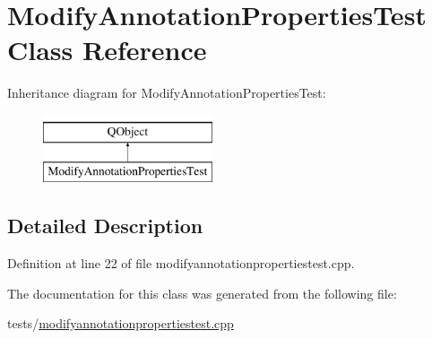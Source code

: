 \hypertarget{classModifyAnnotationPropertiesTest}{\section{Modify\+Annotation\+Properties\+Test Class Reference}
\label{classModifyAnnotationPropertiesTest}
}
Inheritance diagram for Modify\+Annotation\+Properties\+Test\+:\begin{figure}[H]
\begin{center}
\leavevmode
\includegraphics[height=2.000000cm]{classModifyAnnotationPropertiesTest}
\end{center}
\end{figure}


\subsection{Detailed Description}


Definition at line 22 of file modifyannotationpropertiestest.\+cpp.



The documentation for this class was generated from the following file\+:\begin{DoxyCompactItemize}
\item 
tests/\hyperlink{modifyannotationpropertiestest_8cpp}{modifyannotationpropertiestest.\+cpp}\end{DoxyCompactItemize}
